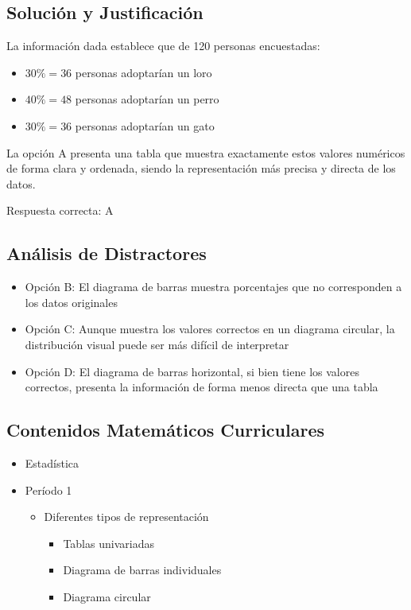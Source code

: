 \documentclass[
]{article}
\providecommand{\tightlist}{%
  \setlength{\itemsep}{0pt}\setlength{\parskip}{0pt}}
\begin{document}
\subsection{Solución y
Justificación}\label{soluciuxf3n-y-justificaciuxf3n}

La información dada establece que de 120 personas encuestadas:

\begin{itemize}
\tightlist
\item
  \(30\% = 36\) personas adoptarían un loro
\item
  \(40\% = 48\) personas adoptarían un perro\\
\item
  \(30\% = 36\) personas adoptarían un gato
\end{itemize}

La opción A presenta una tabla que muestra exactamente estos valores
numéricos de forma clara y ordenada, siendo la representación más
precisa y directa de los datos.

Respuesta correcta: A

\subsection{Análisis de Distractores}\label{anuxe1lisis-de-distractores}

\begin{itemize}
\tightlist
\item
  Opción B: El diagrama de barras muestra porcentajes que no
  corresponden a los datos originales
\item
  Opción C: Aunque muestra los valores correctos en un diagrama
  circular, la distribución visual puede ser más difícil de interpretar
\item
  Opción D: El diagrama de barras horizontal, si bien tiene los valores
  correctos, presenta la información de forma menos directa que una
  tabla
\end{itemize}

\subsection{Contenidos Matemáticos
Curriculares}\label{contenidos-matemuxe1ticos-curriculares}

\begin{itemize}
\tightlist
\item
  Estadística
\item
  Período 1

  \begin{itemize}
  \tightlist
  \item
    Diferentes tipos de representación

    \begin{itemize}
    \tightlist
    \item
      Tablas univariadas
    \item
      Diagrama de barras individuales
    \item
      Diagrama circular
    \end{itemize}
  \end{itemize}
\end{itemize}
\end{document}
